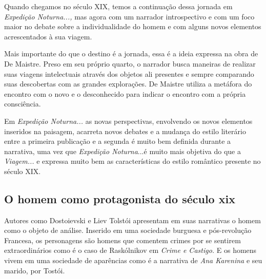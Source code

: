 \documentclass[12pt]{extarticle}
\begin{document}
Quando chegamos no século XIX, temos a continuação dessa jornada em
\emph{Expedição Noturna...,} mas agora com um narrador introspectivo e
com um foco maior no debate sobre a individualidade do homem e com
alguns novos elementos acrescentados à sua viagem.

Mais importante do que o destino é a jornada, essa é a ideia expressa na
obra de De Maistre. Preso em seu próprio quarto, o narrador busca
maneiras de realizar suas viagens intelectuais através dos objetos ali
presentes e sempre comparando suas descobertas com as grandes
explorações. De Maistre utiliza a metáfora do encontro com o novo e o
desconhecido para indicar o encontro com a própria consciência.




Em \emph{Expedição Noturna...} as novas perspectivas, envolvendo os
novos elementos inseridos na paisagem, acarreta novos debates e a
mudança do estilo literário entre a primeira publicação e a segunda é
muito bem definida durante a narrativa, uma vez que \emph{Expedição
Noturna}...é muito mais objetiva do que a \emph{Viagem...} e expressa
muito bem as características do estilo romântico presente no século XIX.

\subsection{O homem como protagonista do século xix}

Autores como Dostoievski e Liev Tolstói apresentam em suas narrativas o
homem como o objeto de análise. Inserido em uma sociedade burguesa e
pós-revolução Francesa, os personagens são homens que comentem crimes
por se sentirem extraordinários como é o caso de Raskólnikov em
\emph{Crime e Castigo.} E os homens vivem em uma sociedade de aparências
como é a narrativa de \emph{Ana Karenina} e seu marido, por Tostói.




\end{document}
